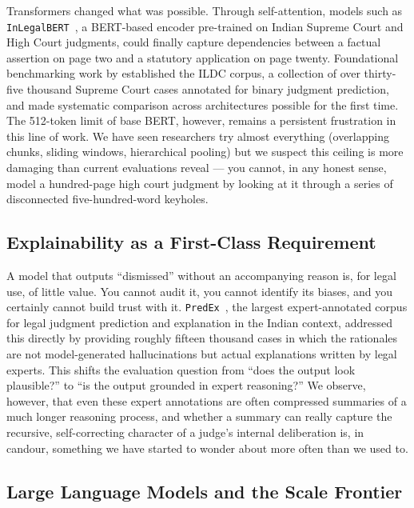 Transformers changed what was possible. Through self-attention, models such as \texttt{InLegalBERT}~\cite{paul-etal-2023-inlegalbert}, a BERT-based encoder pre-trained on Indian Supreme Court and High Court judgments, could finally capture dependencies between a factual assertion on page two and a statutory application on page twenty. Foundational benchmarking work by \cite{malik-etal-2021-ildc} established the ILDC corpus, a collection of over thirty-five thousand Supreme Court cases annotated for binary judgment prediction, and made systematic comparison across architectures possible for the first time. The 512-token limit of base BERT, however, remains a persistent frustration in this line of work. We have seen researchers try almost everything (overlapping chunks, sliding windows, hierarchical pooling) but we suspect this ceiling is more damaging than current evaluations reveal — you cannot, in any honest sense, model a hundred-page high court judgment by looking at it through a series of disconnected five-hundred-word keyholes.

\subsection{Explainability as a First-Class Requirement}

A model that outputs ``dismissed'' without an accompanying reason is, for legal use, of little value. You cannot audit it, you cannot identify its biases, and you certainly cannot build trust with it. \texttt{PredEx}~\cite{nigam-etal-2024-predex}, the largest expert-annotated corpus for legal judgment prediction and explanation in the Indian context, addressed this directly by providing roughly fifteen thousand cases in which the rationales are not model-generated hallucinations but actual explanations written by legal experts. This shifts the evaluation question from ``does the output look plausible?'' to ``is the output grounded in expert reasoning?'' We observe, however, that even these expert annotations are often compressed summaries of a much longer reasoning process, and whether a summary can really capture the recursive, self-correcting character of a judge's internal deliberation is, in candour, something we have started to wonder about more often than we used to.

\subsection{Large Language Models and the Scale Frontier}

